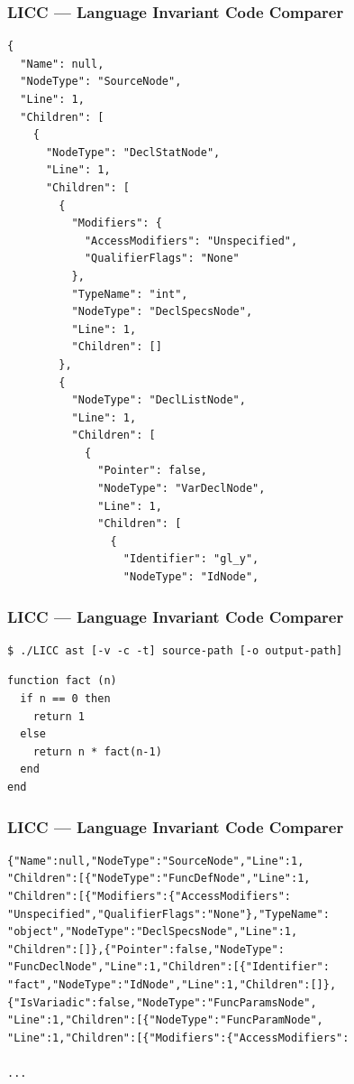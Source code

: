 \documentclass{beamer}
\begin{document}
\begin{frame}[fragile]
    \frametitle{LICC --- Language Invariant Code Comparer}
\begin{lstlisting}[language={},basicstyle=\tiny]
{
  "Name": null,
  "NodeType": "SourceNode",
  "Line": 1,
  "Children": [
    {
      "NodeType": "DeclStatNode",
      "Line": 1,
      "Children": [
        {
          "Modifiers": {
            "AccessModifiers": "Unspecified",
            "QualifierFlags": "None"
          },
          "TypeName": "int",
          "NodeType": "DeclSpecsNode",
          "Line": 1,
          "Children": []
        },
        {
          "NodeType": "DeclListNode",
          "Line": 1,
          "Children": [
            {
              "Pointer": false,
              "NodeType": "VarDeclNode",
              "Line": 1,
              "Children": [
                {
                  "Identifier": "gl_y",
                  "NodeType": "IdNode",
\end{lstlisting}
\end{frame}

\begin{frame}[fragile]
    \frametitle{LICC --- Language Invariant Code Comparer}
\begin{lstlisting}[numbers=none,language={}]
$ ./LICC ast [-v -c -t] source-path [-o output-path]
\end{lstlisting}
\begin{lstlisting}
function fact (n)
  if n == 0 then
    return 1
  else
    return n * fact(n-1)
  end
end
\end{lstlisting}
\end{frame}

\begin{frame}[fragile]
    \frametitle{LICC --- Language Invariant Code Comparer}
\begin{lstlisting}[language={},numbers=none]
{"Name":null,"NodeType":"SourceNode","Line":1,
"Children":[{"NodeType":"FuncDefNode","Line":1,
"Children":[{"Modifiers":{"AccessModifiers":
"Unspecified","QualifierFlags":"None"},"TypeName":
"object","NodeType":"DeclSpecsNode","Line":1,
"Children":[]},{"Pointer":false,"NodeType":
"FuncDeclNode","Line":1,"Children":[{"Identifier":
"fact","NodeType":"IdNode","Line":1,"Children":[]},
{"IsVariadic":false,"NodeType":"FuncParamsNode",
"Line":1,"Children":[{"NodeType":"FuncParamNode",
"Line":1,"Children":[{"Modifiers":{"AccessModifiers":

...
\end{lstlisting}
\end{frame}
\end{document}
